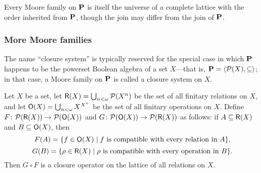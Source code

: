 Every Moore family on $\mathbf{P}$ is itself the universe of a complete lattice with the order inherited
from $\mathbf{P}$, though the join may differ from the join of $\mathbf{P}$.

\subsubsection{More Moore families}
The name ``closure system'' is typically reserved for the special case
in which $\mathbf{P}$ happens to be the powerset Boolean
algebra of a set $X$---that is, $\mathbf{P} = \langle\mathcal{P}(X), \subseteq\rangle$; in that case, a Moore family on $\mathbf{P}$ 
is called a closure system on $X$. 

\begin{example}
  Let $X$ be a set,
  let $\mathsf{R}(X) = \bigcup_{n<\omega}\mathcal{P}(X^n)$ be the set of all finitary
  relations on $X$, and let
  $\mathsf{O}(X) = \bigcup_{n< \omega} X^{X^n}$ be the set of all finitary operations on $X$.
  Define $F \colon  \mathcal{P}(\mathsf{R}(X)) \to \mathcal{P}(\mathsf{O}(X))$
  and $G \colon \mathcal{P}(\mathsf{O}(X)) \to \mathcal{P}(\mathsf{R}(X))$ as follows:
  if $A \subseteq\mathsf{R}(X)$ and $B \subseteq \mathsf{O}(X)$, then
  \[
  F(A) = \{f \in \mathsf{O}(X) \mid f \text{ is compatible with every relation in $A$}\},
  \]
  \[
  G(B) = \{\rho \in \mathsf{R}(X) \mid \rho \text{ is compatible with every operation in $B$}\}.
  \]
  Then $G \circ F$ is a closure operator on the lattice %
  of all relations on $X$.
\end{example}


